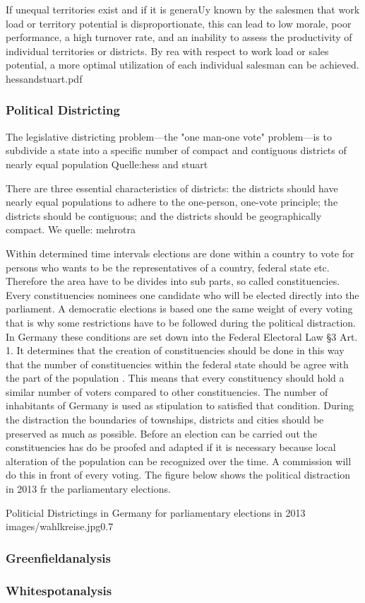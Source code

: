 If unequal territories exist and if it is generaUy known by the salesmen
that work load or territory potential is disproportionate, this can lead to low morale,
poor performance, a high turnover rate, and an inability to assess the productivity of
individual territories or districts. By rea%
with respect to work load or sales potential, a more optimal utilization of each individual
salesman can be achieved.
hessandstuart.pdf

\subsubsection{Political Districting}
The legislative
districting problem—the "one man-one vote" problem—is to subdivide a state into a
specific number of compact and contiguous districts of nearly equal population 
Quelle:hess and stuart


There are three essential characteristics of districts:
the districts should have nearly equal populations to
adhere to the one-person, one-vote principle; the districts
should be contiguous; and the districts should be
geographically compact. We
quelle: mehrotra

Within determined time intervals elections are done within a country to vote for persons who wants to be the representatives of a country, federal state etc. Therefore the area have to be divides into sub parts, so called constituencies. Every constituencies nominees one candidate who will be elected directly into the parliament.  A democratic elections is based one the same weight of every voting that is why some restrictions have to be followed during the political distraction. In Germany these conditions are set down into the Federal Electoral Law §3 Art. 1. It determines that the creation of constituencies should be done in this way that the number of constituencies within the federal state should be agree with the part of the population \cite{bund}. This means that every constituency should hold a similar number of voters compared to other constituencies. The number of inhabitants of Germany is used as stipulation to satisfied that condition. During the distraction the boundaries of townships, districts and cities should be preserved as much as possible. Before an election can be carried out the constituencies has do be proofed and adapted if it is necessary because local alteration of the population can be recognized over the time. A commission will do this in front of every voting. The figure below shows the political distraction in 2013 fr the parliamentary elections.


\begin{figurevarSize}{Politicial Districtings in Germany for parliamentary elections in 2013 \cite{bund}}{images/wahlkreise.jpg}{0.7}\end{figurevarSize}


\subsubsection{Greenfieldanalysis}
\subsubsection{Whitespotanalysis}